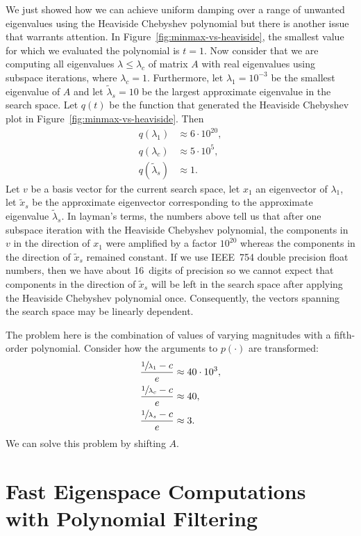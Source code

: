 \documentclass[%
	paper=a4,
	fontsize=10pt,
	DIV11,BCOR10mm,
	numbers=noenddot,
	abstract=yes
]{scrartcl}
\newcommand{\almost}[1]{\widetilde{#1}}
\theoremstyle{definition}
\begin{document}
We just showed how we can achieve uniform damping over a range of unwanted
eigenvalues using the Heaviside Chebyshev polynomial but there is another issue
that warrants attention. In Figure~\ref{fig:minmax-vs-heaviside}, the smallest
value for which we evaluated the polynomial is $t = 1$. Now consider that we are
computing all eigenvalues $\lambda \leq \lambda_c$ of matrix $A$ with real
eigenvalues using subspace iterations, where $\lambda_c = 1$. Furthermore, let
$\lambda_1 = 10^{-3}$ be the smallest eigenvalue of $A$ and let
$\almost{\lambda}_s = 10$ be the largest approximate eigenvalue in the search
space. Let $q(t)$ be the function that generated the Heaviside Chebyshev plot in
Figure~\ref{fig:minmax-vs-heaviside}. Then
\begin{align*}
	q(\lambda_1) &\approx 6 \cdot 10^{20}, \\
	q(\lambda_c) &\approx 5 \cdot 10^5, \\
	q(\almost{\lambda}_s) &\approx 1.
\end{align*}
Let $v$ be a basis vector for the current search space, let $x_1$ an eigenvector
of $\lambda_1$, let $\almost{x}_s$ be the approximate eigenvector corresponding
to the approximate eigenvalue $\almost{\lambda}_s$. In layman's terms, the
numbers above tell us that after one subspace iteration with the Heaviside
Chebyshev polynomial, the components in $v$ in the direction of $x_1$ were
amplified by a factor $10^{20}$ whereas the components in the
direction of $\almost{x}_s$ remained constant. If we use IEEE~754 double
precision float numbers, then we have about 16~digits of precision
\cite[§2.7.2]{Golub2012} so we cannot expect that components in the direction of
$\almost{x}_s$ will be left in the search space after applying the Heaviside
Chebyshev polynomial once. Consequently, the vectors spanning the search space
may be linearly dependent.

The problem here is the combination of values of varying magnitudes with a
fifth-order polynomial. Consider how the arguments to $p(\cdot)$ are
transformed:
\begin{align*}
	\frac{\sfrac{1}{\lambda_1} - c}{e} &\approx 40 \cdot 10^3, \\
	\frac{\sfrac{1}{\lambda_c} - c}{e} &\approx 40, \\
	\frac{\sfrac{1}{\lambda_s} - c}{e} &\approx 3.
\end{align*}
We can solve this problem by shifting $A$.



\section{Fast Eigenspace Computations with Polynomial Filtering}
\end{document}
